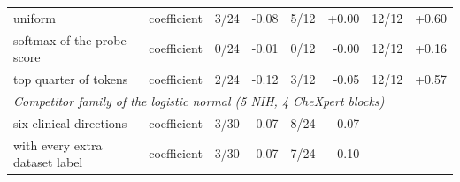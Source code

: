 \begin{table}[tp]
{\begin{tabular}{llrrrrrr}
\quad uniform & coefficient & 3/24 & -0.08 & 5/12 & +0.00 & 12/12 & +0.60 \\
\quad softmax of the probe score & coefficient & 0/24 & -0.01 & 0/12 & -0.00 & 12/12 & +0.16 \\
\quad top quarter of tokens & coefficient & 2/24 & -0.12 & 3/12 & -0.05 & 12/12 & +0.57 \\
\midrule
\multicolumn{8}{l}{\textit{Competitor family of the logistic normal (5 NIH, 4 CheXpert blocks)}} \\
\quad six clinical directions & coefficient & 3/30 & -0.07 & 8/24 & -0.07 & -- & -- \\
\quad with every extra dataset label & coefficient & 3/30 & -0.07 & 7/24 & -0.10 & -- & -- \\
\bottomrule
\end{tabular}}
\end{table}
